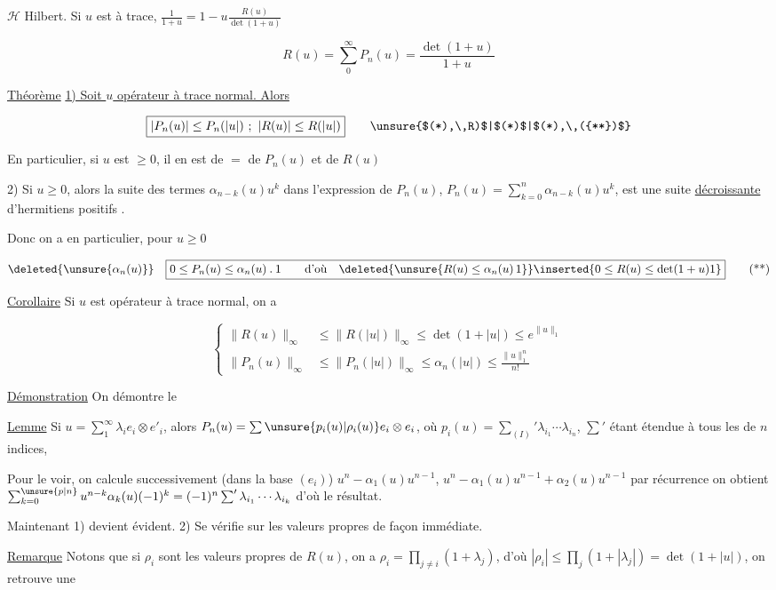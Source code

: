 
$\mathscr H$ Hilbert. Si $u$ est à trace, $\frac1{1+u}=1-u\frac{R(u)}{\det(1+u)}$

\[
R(u)=\sum_0^\infty P_n(u)=\frac{\det(1+u)}{1+u}
\]

\uline{Théorème} \uline{1) Soit $u$ opérateur  à trace normal. Alors}

\[
\boxed{|P_n(u)|\leq P_n(|u|)\ ;\ |R(u)|\leq R(|u|)}\tag*{\unsure{$(*),\,R)$|$(*)$|$(*),\,({**})$}}
\]

En particulier, si $u$ est $\geq0$, il en est de $=$ de $P_n(u)$ et de $R(u)$

2) Si $u\geq0$, alors la suite des termes $\alpha_{n-k}(u)u^k$ dans l'expression de $P_n(u)$, $P_n(u)=\sum_{k=0}^n\alpha_{n-k}(u)u^k$, est une suite \uline{décroissante} d'hermitiens positifs .

Donc on a en particulier, pour $u\geq0$

\[
\deleted{\unsure{\alpha_n(u)}}\quad
\boxed{0\leq P_n(u)\leq\alpha_n(u)\mathbin{.}1\qquad\text{d'où}\quad
\deleted{\unsure{R(u)\leq\alpha_n(u)\,1}}\inserted{0\leq R(u)\leq\det(1+u)1}}\tag*{(**)}
\]

 \uline{Corollaire} Si $u$ est opérateur  à trace normal, on a

\[
\left\{\begin{aligned}
\|R(u)\|_\infty&\leq\|R(|u|)\|_\infty\leq\det(1+|u|)\leq e^{\|u\|_1}\\
\|P_n(u)\|_\infty&\leq\|P_n(|u|)\|_\infty\leq\alpha_n(|u|)\leq\frac{\|u\|_1^n}{n!}
\end{aligned}\right.\tag*{(***)}
\]

\uline{Démonstration} On démontre le

\uline{Lemme} Si  $u=\sum_1^\infty\lambda_i e_i\otimes e'_i$, alors $P_n(u)=\sum\unsure{p_i(u)|\rho_i(u)}e_i\otimes e_i$, où $p_i(u)=\sum_{(I)}'\lambda_{i_1}\cdots\lambda_{i_n}$, $\sum'$ étant étendue à tous les   de $n$ indices, 

Pour le voir, on calcule successivement (dans la base $(e_i)$) $u^n-$$\alpha_1(u)u^{n-1}$, $u^n-\alpha_1(u)u^{n-1}+\alpha_2(u)u^{n-1}$ par récurrence on obtient $\sum_{k=0}^{\unsure{p|n}}u^{n-k}\alpha_k(u)(-1)^k=(-1)^n\sum'\lambda_{i_1}\cdots\lambda_{i_k}$ d'où  le résultat.

Maintenant 1) devient évident. 2) Se vérifie sur les valeurs propres de façon immédiate.

\uline{Remarque} Notons que si $\rho_i$ sont les valeurs propres de $R(u)$, on a $\rho_i=\prod_{j\neq i}(1+\lambda_j)$, d'où $|\rho_i|\leq\prod_j(1+|\lambda_j|)=\det(1+\lvert u\rvert)$, on retrouve une
